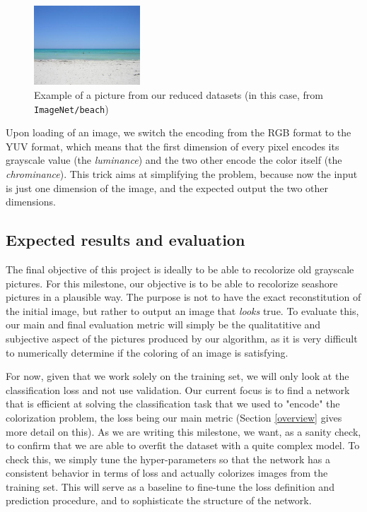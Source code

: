 \documentclass[10pt,twocolumn,letterpaper]{article}
\begin{document}
\begin{figure}
\begin{center}
\includegraphics[width=150px]{img/beach.jpg}
\caption{Example of a picture from our reduced datasets (in this case, from \texttt{ImageNet/beach})}
\label{inex}
\end{center}
\end{figure}

Upon loading of an image, we switch the encoding from the RGB format to the YUV format, which means that the first dimension of every pixel encodes its grayscale value (the \textit{luminance}) and the two other encode the color itself (the \textit{chrominance}). This trick aims at simplifying the problem, because now the input is just one dimension of the image, and the expected output the two other dimensions.

\subsection{Expected results and evaluation}


The final objective of this project is ideally to be able to recolorize old grayscale pictures. For this milestone, our objective is to be able to recolorize seashore pictures in a plausible way. The purpose is not to have the exact reconstitution of the initial image, but rather to output an image that \textit{looks} true. To evaluate this, our main and final evaluation metric will simply be the qualitatitive and subjective aspect of the pictures produced by our algorithm, as it is very difficult to numerically determine if the coloring of an image is satisfying.

For now, given that we work solely on the training set, we will only look at the classification loss and not use validation. Our current focus is to find a network that is efficient at solving the classification task that we used to "encode" the colorization problem, the loss being our main metric (Section \ref{overview} gives more detail on this). As we are writing this milestone, we want, as a sanity check, to confirm that we are able to overfit the dataset with a quite complex model. To check this, we simply tune the hyper-parameters so that the network has a consistent behavior in terms of loss and actually colorizes images from the training set.
This will serve as a baseline to fine-tune the loss definition and prediction procedure, and to sophisticate the structure of the network.
\end{document}
